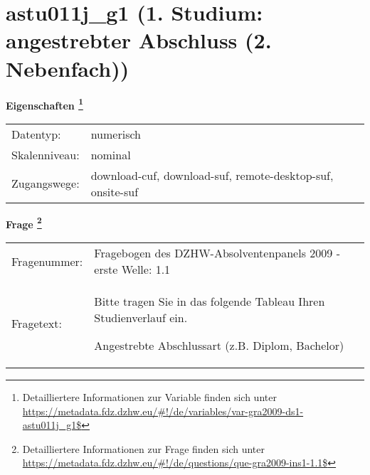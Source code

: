 
    \setcounter{footnote}{0}

    \vspace*{-1.8cm}
	\section{astu011j\_g1 (1. Studium: angestrebter Abschluss (2. Nebenfach))}
	\label{section:astu011j_g1}



    \vspace*{0.5cm}
    \noindent\textbf{Eigenschaften
	\footnote{Detailliertere Informationen zur Variable finden sich unter
		\url{https://metadata.fdz.dzhw.eu/\#!/de/variables/var-gra2009-ds1-astu011j_g1$}}}\\
	\begin{tabularx}{\hsize}{@{}lX}
	Datentyp: & numerisch \\
	Skalenniveau: & nominal \\
	Zugangswege: &
	  download-cuf, 
	  download-suf, 
	  remote-desktop-suf, 
	  onsite-suf
 \\
    \end{tabularx}



				\vspace*{0.5cm}
                \noindent\textbf{Frage
	                \footnote{Detailliertere Informationen zur Frage finden sich unter
		              \url{https://metadata.fdz.dzhw.eu/\#!/de/questions/que-gra2009-ins1-1.1$}}}\\
				\begin{tabularx}{\hsize}{@{}lX}
					Fragenummer: &
					  Fragebogen des DZHW-Absolventenpanels 2009 - erste Welle:
					  1.1
 \\
					Fragetext: & Bitte tragen Sie in das folgende Tableau Ihren Studienverlauf ein.\par  Angestrebte Abschlussart (z.B. Diplom, Bachelor) \\
				\end{tabularx}





